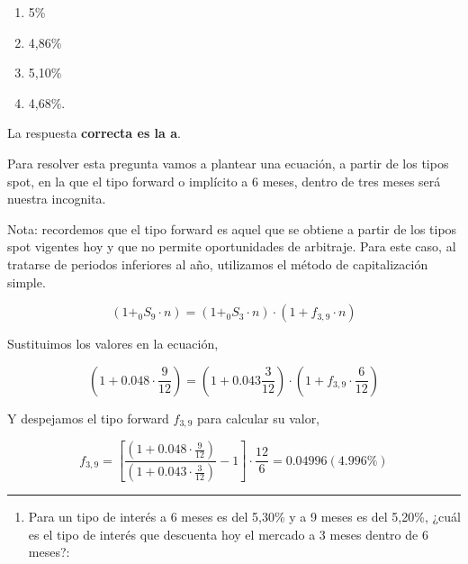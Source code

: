 \documentclass[
  letterpaper,
  DIV=11,
  numbers=noendperiod]{scrreprt}
\providecommand{\tightlist}{%
  \setlength{\itemsep}{0pt}\setlength{\parskip}{0pt}}\usepackage{longtable,booktabs,array}
\begin{document}
\begin{enumerate}
\def\labelenumi{\alph{enumi}.}
\item
  5\%
\item
  4,86\%
\item
  5,10\%
\item
  4,68\%.
\end{enumerate}

\begin{tcolorbox}[enhanced jigsaw, left=2mm, opacityback=0, colback=white, breakable, arc=.35mm, bottomrule=.15mm, rightrule=.15mm, toprule=.15mm, leftrule=.75mm, colframe=quarto-callout-tip-color-frame]
\begin{minipage}[t]{5.5mm}
\textcolor{quarto-callout-tip-color}{\faLightbulb}
\end{minipage}%
\begin{minipage}[t]{\textwidth - 5.5mm}

La respuesta \textbf{correcta es la a}.

Para resolver esta pregunta vamos a plantear una ecuación, a partir de
los tipos spot, en la que el tipo forward o implícito a 6 meses, dentro
de tres meses será nuestra incognita.

Nota: recordemos que el tipo forward es aquel que se obtiene a partir de
los tipos spot vigentes hoy y que no permite oportunidades de arbitraje.
Para este caso, al tratarse de periodos inferiores al año, utilizamos el
método de capitalización simple.

\[(1+_{0}S_{9} \cdot {n})=(1+_{0}S_{3} \cdot n)\cdot(1+f_{3,9}\cdot {n})\]

Sustituimos los valores en la ecuación,

\[(1+0.048\cdot \frac{9}{12})=(1+0.043\frac{3}{12})\cdot(1+f_{3,9}\cdot \frac{6}{12})\]

Y despejamos el tipo forward \(f_{3,9}\) para calcular su valor,

\[f_{3,9}=\left[\frac{(1+0.048\cdot \frac{9}{12})}{(1+0.043\cdot \frac{3}{12})}-1\right]\cdot\frac{ 12}{6 }=0.04996(4.996\%)\]

\end{minipage}%
\end{tcolorbox}

\begin{center}\rule{0.5\linewidth}{0.5pt}\end{center}

\begin{enumerate}
\def\labelenumi{\arabic{enumi}.}
\setcounter{enumi}{36}
\tightlist
\item
  Para un tipo de interés a 6 meses es del 5,30\% y a 9 meses es del
  5,20\%, ¿cuál es el tipo de interés que descuenta hoy el mercado a 3
  meses dentro de 6 meses?:
\end{enumerate}
\end{document}
